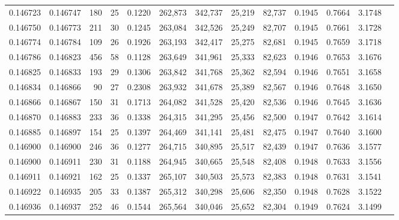 \begin{tabular}{rrrrrrrrrrrrr}
0.146723 & 0.146747 &   180 &  25 &                                     0.1220 & 262,873 & 342,737 &  25,219 &  82,737 & 0.1945 & 0.7664 & 3.1748 \\
0.146750 & 0.146773 &   211 &  30 &                                     0.1245 & 263,084 & 342,526 &  25,249 &  82,707 & 0.1945 & 0.7661 & 3.1728 \\
0.146774 & 0.146784 &   109 &  26 &                                     0.1926 & 263,193 & 342,417 &  25,275 &  82,681 & 0.1945 & 0.7659 & 3.1718 \\
0.146786 & 0.146823 &   456 &  58 &                                     0.1128 & 263,649 & 341,961 &  25,333 &  82,623 & 0.1946 & 0.7653 & 3.1676 \\
0.146825 & 0.146833 &   193 &  29 &                                     0.1306 & 263,842 & 341,768 &  25,362 &  82,594 & 0.1946 & 0.7651 & 3.1658 \\
0.146834 & 0.146866 &    90 &  27 &                                     0.2308 & 263,932 & 341,678 &  25,389 &  82,567 & 0.1946 & 0.7648 & 3.1650 \\
0.146866 & 0.146867 &   150 &  31 &                                     0.1713 & 264,082 & 341,528 &  25,420 &  82,536 & 0.1946 & 0.7645 & 3.1636 \\
0.146870 & 0.146883 &   233 &  36 &                                     0.1338 & 264,315 & 341,295 &  25,456 &  82,500 & 0.1947 & 0.7642 & 3.1614 \\
0.146885 & 0.146897 &   154 &  25 &                                     0.1397 & 264,469 & 341,141 &  25,481 &  82,475 & 0.1947 & 0.7640 & 3.1600 \\
0.146900 & 0.146900 &   246 &  36 &                                     0.1277 & 264,715 & 340,895 &  25,517 &  82,439 & 0.1947 & 0.7636 & 3.1577 \\
0.146900 & 0.146911 &   230 &  31 &                                     0.1188 & 264,945 & 340,665 &  25,548 &  82,408 & 0.1948 & 0.7633 & 3.1556 \\
0.146911 & 0.146921 &   162 &  25 &                                     0.1337 & 265,107 & 340,503 &  25,573 &  82,383 & 0.1948 & 0.7631 & 3.1541 \\
0.146922 & 0.146935 &   205 &  33 &                                     0.1387 & 265,312 & 340,298 &  25,606 &  82,350 & 0.1948 & 0.7628 & 3.1522 \\
0.146936 & 0.146937 &   252 &  46 &                                     0.1544 & 265,564 & 340,046 &  25,652 &  82,304 & 0.1949 & 0.7624 & 3.1499 \\

\end{tabular}
